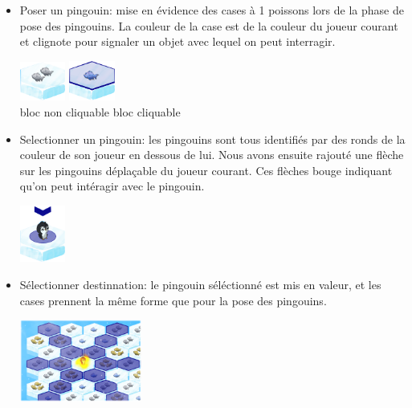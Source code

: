 \documentclass{report}
\begin{document}
\begin{itemize}
\item Poser un pingouin: mise en évidence des cases à 1 poissons lors de la phase de pose des pingouins. La couleur de la case est de la couleur du joueur courant et clignote pour signaler un objet avec lequel on peut interragir.

  \begin{center}
    \includegraphics[width=1.5cm]{image/bloc_simple.png}    
    \hspace{1cm}
    \includegraphics[width=1.5cm]{image/bloc_mev.png}
    \\
    bloc non cliquable \hspace{0.5cm} bloc cliquable
  \end{center}

\item Selectionner un pingouin: les pingouins sont tous identifiés par des ronds de la couleur de son joueur en dessous de lui. Nous avons ensuite rajouté une flèche sur les pingouins déplaçable du joueur courant. Ces flèches bouge indiquant qu'on peut intéragir avec le pingouin.
  \begin{center}
    \includegraphics[width=1.5cm]{image/bloc_pingouin.png}    
  \end{center}

\item Sélectionner destinnation: le pingouin séléctionné est mis en valeur, et les cases prennent la même forme que pour la pose des pingouins.
  \begin{center}
    \includegraphics[width=4cm]{image/case_select_dest.png}    
  \end{center}


\end{itemize}
\end{document}
